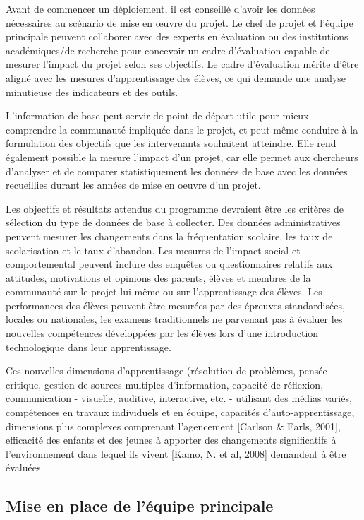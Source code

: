 \documentclass[11pt]{article}
\begin{document}
Avant de commencer un déploiement, il est conseillé d'avoir les données
nécessaires au scénario de mise en œuvre du projet. Le chef de projet et
l'équipe principale peuvent collaborer avec des experts en évaluation ou
des institutions académiques/de recherche pour concevoir un cadre
d'évaluation capable de mesurer l'impact du projet selon ses objectifs. Le
cadre d’évaluation mérite d'être aligné avec les mesures d'apprentissage
des élèves, ce qui demande une analyse minutieuse des indicateurs et des
outils.

L'information de base peut servir de point de départ utile pour mieux
comprendre la communauté impliquée dans le projet, et peut même conduire à
la formulation des objectifs que les intervenants souhaitent
atteindre. Elle rend également possible la mesure l'impact d'un projet, car
elle permet aux chercheurs d'analyser et de comparer statistiquement les
données de base avec les données recueillies durant les années de mise en
oeuvre d'un projet.

Les objectifs et résultats attendus du programme devraient être les
critères de sélection du type de données de base à collecter. Des données
administratives peuvent mesurer les changements dans la fréquentation
scolaire, les taux de scolarisation et le taux d’abandon. Les mesures de
l'impact social et comportemental peuvent inclure des enquêtes ou
questionnaires relatifs aux attitudes, motivations et opinions des parents,
élèves et membres de la communauté sur le projet lui-même ou sur
l'apprentissage des élèves. Les performances des élèves peuvent être
mesurées par des épreuves standardisées, locales ou nationales, les examens
traditionnels ne parvenant pas à évaluer les nouvelles compétences
développées par les élèves lors d'une introduction technologique dans leur
apprentissage.

Ces nouvelles dimensions d'apprentissage (résolution de problèmes, pensée
critique, gestion de sources multiples d'information, capacité de
réflexion, communication - visuelle, auditive, interactive, etc. -
utilisant des médias variés, compétences en travaux individuels et en
équipe,  capacités d'auto-apprentissage, dimensions plus complexes
comprenant l'agencement [Carlson \& Earls, 2001], efficacité des enfants et
des jeunes à apporter des changements significatifs à l'environnement dans
lequel ils vivent [Kamo, N. et al, 2008] demandent à être évaluées.
\subsection{Mise en place de l'équipe principale}
\label{sec-9-2}
\end{document}
